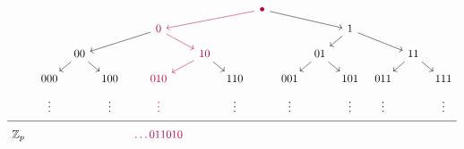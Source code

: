 \newcommand\lacolora{purple} 
\newcommand\lacouleur{\color{\lacolora}}  
\[\begin{tikzcd}[sep=tiny]
	&&&&&&& \lacouleur{\bullet} \\
	&&&& \lacouleur{0} &&&&&& 1 \\
	\\
	&& 00 &&& \lacouleur{10} &&&& 01 &&& 11 \\
	\\
	&000 && 100 & \lacouleur{010} && 110 && 001 && 101 & 011 && 111\\
	&\vdots && \vdots & \lacouleur{\vdots} && \vdots && \vdots && \vdots & \vdots && \vdots\\
	\hline\\
	\mathbb{Z}_p&      &&& \lacouleur{\ldots011010}&&&&&&&&&
	\arrow[from=4-3, to=6-2]
	\arrow[from=4-3, to=6-4]
	\arrow[from=4-6, to=6-5, \lacolora]
	\arrow[from=4-6, to=6-7]
	\arrow[from=2-5, to=4-3]
	\arrow[from=2-5, to=4-6, \lacolora]
	\arrow[from=4-10, to=6-9]
	\arrow[from=4-10, to=6-11]
	\arrow[from=4-13, to=6-12]
	\arrow[from=4-13, to=6-14]
	\arrow[from=2-11, to=4-10]
	\arrow[from=2-11, to=4-13]
	\arrow[from=1-8, to=2-5, \lacolora]
	\arrow[from=1-8, to=2-11]
\end{tikzcd}\]

